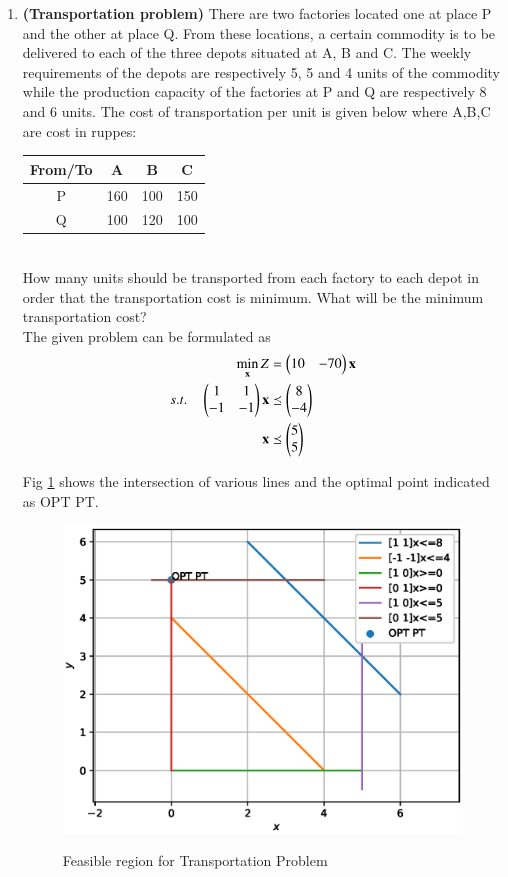 \begin{enumerate}[label=\arabic*.,ref=\thesection.\theenumi]
\item \textbf{(Transportation problem)} There are two factories located one at
place P and the other at place Q. From these locations, a certain commodity is to be
delivered to each of the three depots situated at A, B and C. The weekly requirements
of the depots are respectively 5, 5 and 4 units of the commodity while the production
capacity of the factories at P and Q are respectively 8 and 6 units. The cost of transportation per unit is given below where A,B,C are cost in ruppes:\\
\begin{tabular}{|c|c|c|c|}
\hline
From/To & A & B & C\\
\hline
P & 160 & 100 & 150\\
\hline
Q & 100 &120 & 100\\
\hline
\end{tabular}\\
How many units should be transported from each factory to each depot in order that
the transportation cost is minimum. What will be the minimum transportation cost?
\\
\solution The given problem can be formulated as
\begin{align}
\min_{\mathbf{x}} Z &= \begin{pmatrix}10 & -70\end{pmatrix}\mathbf{x}
\\
s.t. \quad 
\begin{pmatrix}
1 & 1
\\
-1 & -1
\end{pmatrix}
\mathbf{x} & \preceq \begin{pmatrix}8\\-4\end{pmatrix}
\\
\mathbf{x} &\preceq \begin{pmatrix}5\\5\end{pmatrix}
\label{eq:transport}
\end{align}

Fig  \ref{fig:transport}
shows the intersection of various lines and the optimal point indicated as OPT PT.
\begin{figure}[h]
\includegraphics[width=\columnwidth]{./figs/lp_transport.eps}
\caption{Feasible region for Transportation Problem}
\caption{}
\label{fig:transport}
\end{figure}


\end{enumerate}
